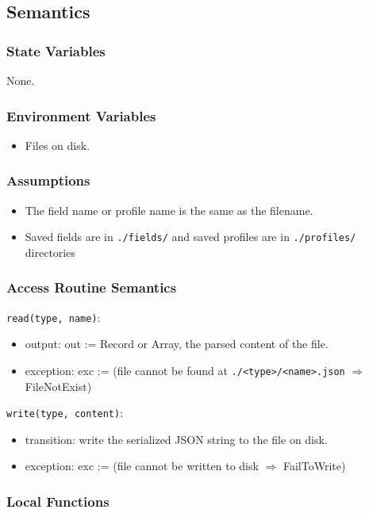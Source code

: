 \documentclass[12pt, titlepage]{article}
\begin{document}
\subsection{Semantics}

\subsubsection{State Variables}
None.

\subsubsection{Environment Variables}
\begin{itemize}
  \item Files on disk.
\end{itemize}

\subsubsection{Assumptions}
\begin{itemize}
  \item The field name or profile name is the same as the filename.
  \item Saved fields are in \texttt{./fields/} and saved profiles are in \texttt{./profiles/} directories
\end{itemize}


\subsubsection{Access Routine Semantics}

\noindent \texttt{read(type, name)}:
\begin{itemize}
\item output: out := Record or Array, the parsed content of the file.
\item exception: exc := (file cannot be found at \texttt{./<type>/<name>.json} $\Rightarrow$ FileNotExist)
\end{itemize}

\noindent \texttt{write(type, content)}:
\begin{itemize}
\item transition: write the serialized JSON string to the file on disk.
\item exception: exc := (file cannot be written to disk $\Rightarrow$ FailToWrite)
\end{itemize}

\subsubsection{Local Functions}
\end{document}
